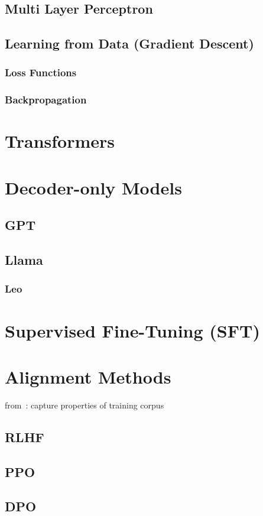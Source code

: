 \subsection{Multi Layer Perceptron}\label{subsec:multi-layer-perceptron}

\subsection{Learning from Data (Gradient Descent)}\label{subsec:learning-from-data}

\subsubsection{Loss Functions}

\subsubsection{Backpropagation}

\section{Transformers}\label{sec:trans}

\section{Decoder-only Models}\label{sec:decoder}

\subsection{GPT}\label{subsec:gpt}

\subsection{Llama}\label{subsec:llama}

\subsubsection{Leo}

\section{Supervised Fine-Tuning (SFT)}\label{sec:supervised-fine-tuning}

\section{Alignment Methods}\label{sec:alignment-methods}
from~\autocite{zhao2023survey}:
capture properties of training corpus

\subsection{RLHF}\label{subsec:rlhf}
\subsection{PPO}\label{subsec:ppo}
\subsection{DPO}\label{subsec:dpo}
